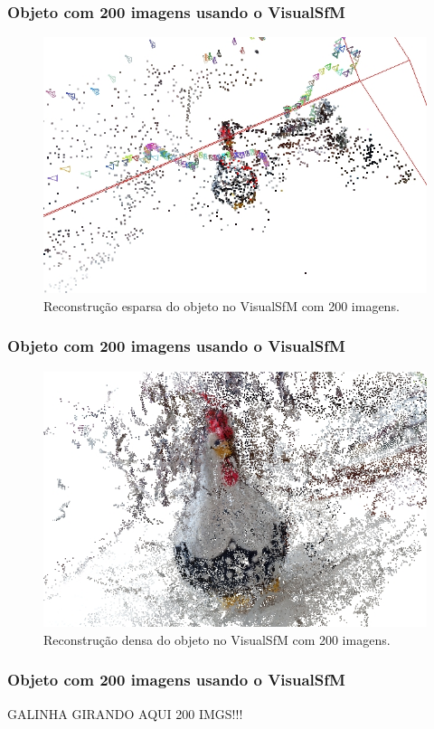 \documentclass[table, usenames, svgnames, xcolor=dvipsnames]{beamer}
\begin{document}
\begin{frame}
\frametitle{\textbf{Objeto com 200 imagens usando o VisualSfM}}
	\begin{figure}[!h]
		\centering
		\includegraphics[width=0.8\linewidth]{figs/galinhasparsa.jpg}
		\caption{%
		Reconstrução esparsa do objeto no VisualSfM com 200 imagens.
		}
	\end{figure}
\end{frame}

\begin{frame}
\frametitle{\textbf{Objeto com 200 imagens usando o VisualSfM}}
	\begin{figure}[!h]
		\centering
		\includegraphics[width=0.8\linewidth]{figs/galinhadense.jpg}
		\caption{%
		Reconstrução densa do objeto no VisualSfM com 200 imagens.
		}
	\end{figure}
\end{frame}

\begin{frame}
\frametitle{\textbf{Objeto com 200 imagens usando o VisualSfM}}
	GALINHA GIRANDO AQUI 200 IMGS!!!
\end{frame}
\end{document}
